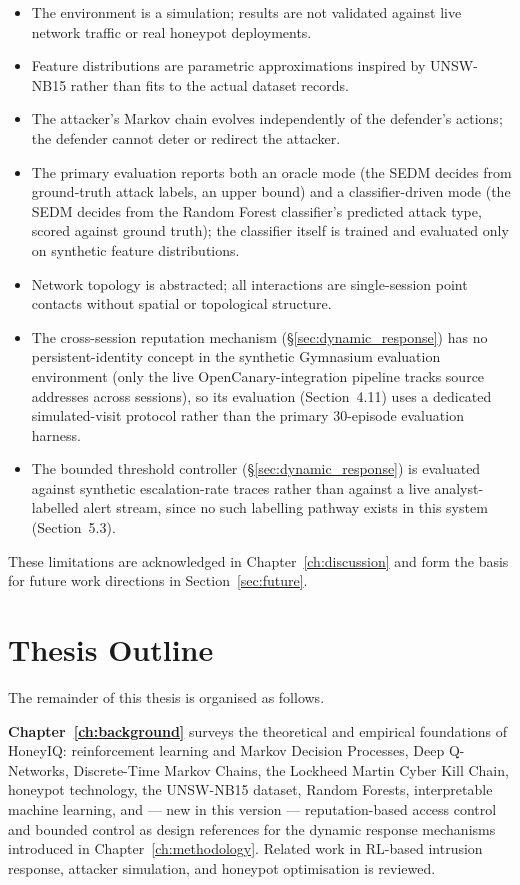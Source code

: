 \begin{itemize}
  \item The environment is a simulation; results are not validated against
        live network traffic or real honeypot deployments.
  \item Feature distributions are parametric approximations inspired by
        UNSW-NB15 rather than fits to the actual dataset records.
  \item The attacker's Markov chain evolves independently of the defender's
        actions; the defender cannot deter or redirect the attacker.
  \item The primary evaluation reports both an oracle mode (the SEDM decides
        from ground-truth attack labels, an upper bound) and a
        classifier-driven mode (the SEDM decides from the Random Forest
        classifier's predicted attack type, scored against ground truth);
        the classifier itself is trained and evaluated only on synthetic
        feature distributions.
  \item Network topology is abstracted; all interactions are single-session
        point contacts without spatial or topological structure.
  \item The cross-session reputation mechanism (\S\ref{sec:dynamic_response})
        has no persistent-identity concept in the synthetic Gymnasium
        evaluation environment (only the live OpenCanary-integration
        pipeline tracks source addresses across sessions), so its
        evaluation (Section~4.11) uses a dedicated simulated-visit protocol
        rather than the primary 30-episode evaluation harness.
  \item The bounded threshold controller (\S\ref{sec:dynamic_response}) is
        evaluated against synthetic escalation-rate traces rather than
        against a live analyst-labelled alert stream, since no such
        labelling pathway exists in this system (Section~5.3).
\end{itemize}

These limitations are acknowledged in Chapter~\ref{ch:discussion} and
form the basis for future work directions in Section~\ref{sec:future}.

\section{Thesis Outline}

The remainder of this thesis is organised as follows.

\noindent\textbf{Chapter~\ref{ch:background}} surveys the theoretical and
empirical foundations of HoneyIQ: reinforcement learning and Markov Decision
Processes, Deep Q-Networks, Discrete-Time Markov Chains, the Lockheed Martin
Cyber Kill Chain, honeypot technology, the UNSW-NB15 dataset, Random Forests,
interpretable machine learning, and --- new in this version --- reputation-based
access control and bounded control as design references for the dynamic
response mechanisms introduced in Chapter~\ref{ch:methodology}.
Related work in RL-based intrusion response, attacker simulation, and
honeypot optimisation is reviewed.


